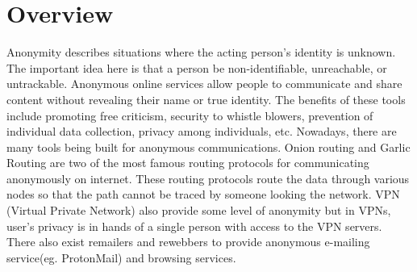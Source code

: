 \documentclass{main}
\begin{document}
\section{Overview}
Anonymity describes situations where the acting person's identity is unknown.
The important idea here is that a person be non-identifiable, unreachable, or untrackable.
Anonymous online services allow people to communicate and share content without revealing their name or true identity.
The benefits of these tools include promoting free criticism, security to whistle blowers, prevention of individual data collection, privacy among individuals, etc.
Nowadays, there are many tools being built for anonymous communications.
Onion routing and Garlic Routing are two of the most famous routing protocols for 
communicating anonymously on internet. These routing protocols route the data through
various nodes so that the path cannot be traced by someone looking the network.
VPN (Virtual Private Network)  also provide some level of anonymity but in VPNs,
user's privacy is in hands of a single person with access to the VPN servers.
There also exist remailers and rewebbers to provide anonymous e-mailing service(eg. ProtonMail)
and browsing services.

\end{document}
